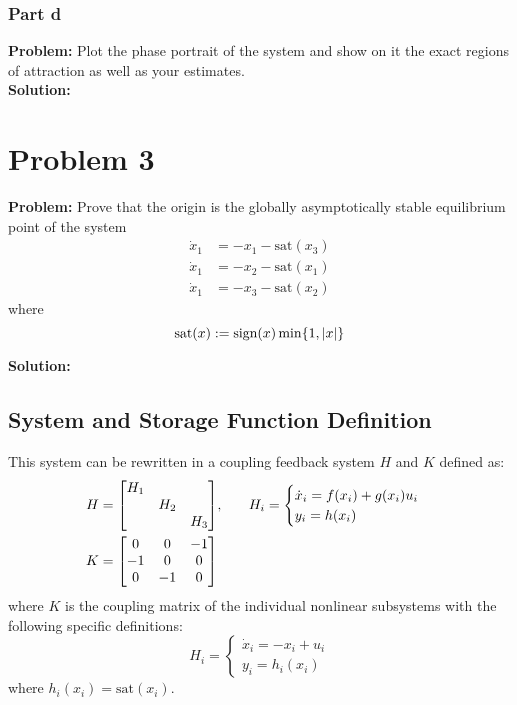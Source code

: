 \documentclass[letter]{article}
\numberwithin{equation}{section}
\newcommand{\sat}{\text{sat}}
\newcommand{\sign}{\text{sign}}
\begin{document}
\newpage
\subsubsection{Part d}
\textbf{Problem:}
Plot the phase portrait of the system and show on it the exact regions of attraction as well as your estimates.\\

\noindent
\textbf{Solution:}





\newpage
\section{Problem 3}
\textbf{Problem:}
Prove that the origin is the globally asymptotically stable equilibrium point of the system
\begin{equation}
	\begin{aligned}
		\dot{x}_1 &= -x_1 - \sat(x_3)\\
		\dot{x}_1 &= -x_2 - \sat(x_1)\\
		\dot{x}_1 &= -x_3 - \sat(x_2)
	\end{aligned}
\end{equation}
where
\begin{equation}
	\sat(x) := \sign(x) \min\{1,\abs{x}\}
\end{equation}

\noindent
\textbf{Solution:}
\subsection{System and Storage Function Definition}
This system can be rewritten in a coupling feedback system $H$ and $K$ defined as:
\begin{align}
	H &= \mqty[\dmat{H_1}{H_2}{H_3}], \hspace{0.25in}
	H_i
	=\begin{cases}
		\dot{x}_i = f(x_i) + g(x_i) u_i\\
		y_i = h(x_i)
	\end{cases}\\
	K &= \mqty[	 0 	& 0 &-1\\
	-1 	& 0 & 0\\
	0 	&-1 & 0]
\end{align}
where $K$ is the coupling matrix of the individual nonlinear subsystems with the following specific definitions:
\begin{equation}
	H_i =
	\begin{cases}
		\dot{x}_i = -x_i + u_i\\
		y_i = h_i(x_i)
	\end{cases}
\end{equation}
where $h_i(x_i) = \sat(x_i)$.
\end{document}
